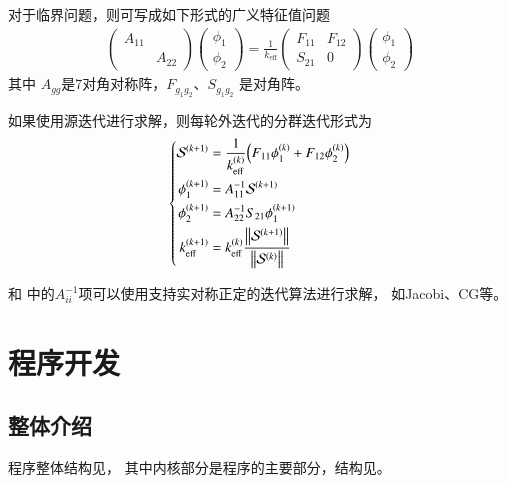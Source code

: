 对于临界问题，则可写成如下形式的广义特征值问题
\begin{align}
  \begin{pmatrix}
  A_{11} &  \\
   & A_{22}
  \end{pmatrix}
  \begin{pmatrix}
  \phi_1 \\ \phi_2
  \end{pmatrix}
  =\frac{1}{k_\mathrm{eff}}
    \begin{pmatrix}
    F_{11} & F_{12} \\
    S_{21} & 0
    \end{pmatrix}
  \begin{pmatrix}
    \phi_1 \\ \phi_2
  \end{pmatrix}
\end{align}
其中 $A_{gg}$是7对角对称阵，$F_{g_1g_2}$、$S_{g_1g_2}$ 是对角阵。

如果使用源迭代进行求解，则每轮外迭代的分群迭代形式为
\begin{align}
  \left\{
  \begin{aligned}
    \mathcal{S}^{(k+1)}&=\frac{1}{k_\mathrm{eff}^{(k)}}\pb[B]{F_{11}\phi_1^{(k)}+F_{12}\phi_2^{(k)}}\\
    \phi_1^{(k+1)}&=A_{11}^{-1}\mathcal{S}^{(k+1)}\\
    \phi_2^{(k+1)}&=A_{22}^{-1}S_{21}\phi_1^{(k+1)}\\
    k_\mathrm{eff}^{(k+1)}&=k_\mathrm{eff}^{(k)}\frac{\left\|\mathcal{S}^{(k+1)}\right\|}{\left\|\mathcal{S}^{(k)}\right\|}
  \end{aligned}
  \right.
  \label{equ:program.group.g2equ.keff}
\end{align}

和
中的$A_{ii}^{-1}$项可以使用支持实对称正定的迭代算法进行求解，
如Jacobi、CG等。


\section{\ProgramName 程序开发}

\subsection{整体介绍}
\ProgramName 程序整体结构见，
其中内核部分是程序的主要部分，结构见。

